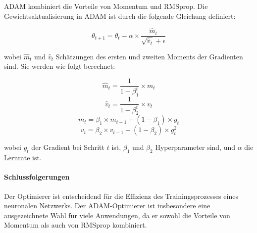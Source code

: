ADAM kombiniert die Vorteile von Momentum und RMSprop. Die Gewichtsaktualisierung in ADAM ist durch die folgende Gleichung definiert:

\begin{equation}
\theta_{t+1} = \theta_t - \alpha \times \frac{\hat{m}_t}{\sqrt{\hat{v}_t} + \epsilon}
\end{equation}

wobei \(\hat{m}_t\) und \(\hat{v}_t\) Schätzungen des ersten und zweiten Moments der Gradienten sind. Sie werden wie folgt berechnet:

\begin{equation}
\hat{m}_t = \frac{1}{1-\beta_1^t} \times m_t
\end{equation}
\begin{equation}
\hat{v}_t = \frac{1}{1-\beta_2^t} \times v_t
\end{equation}
\begin{equation}
m_t = \beta_1 \times m_{t-1} + (1-\beta_1) \times g_t
\end{equation}
\begin{equation}
v_t = \beta_2 \times v_{t-1} + (1-\beta_2) \times g_t^2
\end{equation}

wobei \(g_t\) der Gradient bei Schritt \(t\) ist, \(\beta_1\) und \(\beta_2\) Hyperparameter sind, und \(\alpha\) die Lernrate ist.
\cite{klein_abbeel_cs188}

\paragraph{Schlussfolgerungen}

Der Optimierer ist entscheidend für die Effizienz des Trainingsprozesses eines neuronalen Netzwerks. Der ADAM-Optimierer ist insbesondere eine ausgezeichnete Wahl für viele Anwendungen, da er sowohl die Vorteile von Momentum als auch von RMSprop kombiniert.

